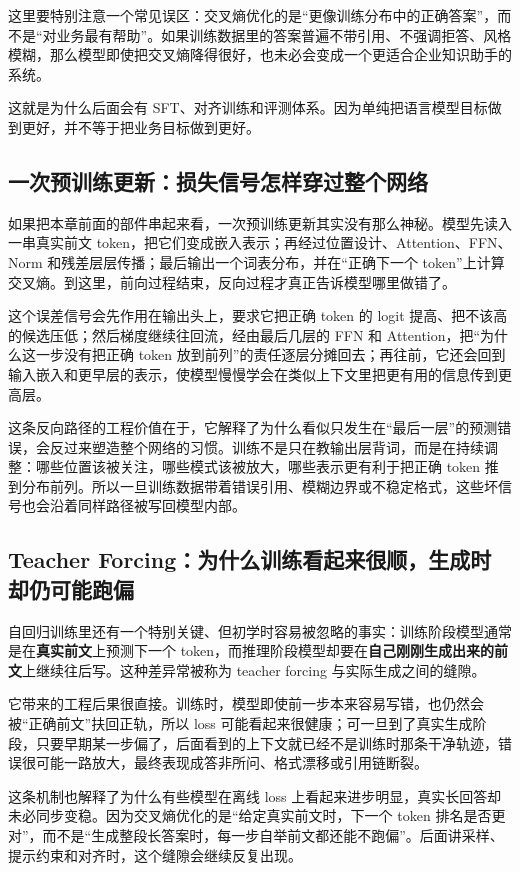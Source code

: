这里要特别注意一个常见误区：交叉熵优化的是“更像训练分布中的正确答案”，而不是“对业务最有帮助”。如果训练数据里的答案普遍不带引用、不强调拒答、风格模糊，那么模型即使把交叉熵降得很好，也未必会变成一个更适合企业知识助手的系统。

这就是为什么后面会有 SFT、对齐训练和评测体系。因为单纯把语言模型目标做到更好，并不等于把业务目标做到更好。

\subsection{一次预训练更新：损失信号怎样穿过整个网络}
如果把本章前面的部件串起来看，一次预训练更新其实没有那么神秘。模型先读入一串真实前文 token，把它们变成嵌入表示；再经过位置设计、Attention、FFN、Norm 和残差层层传播；最后输出一个词表分布，并在“正确下一个 token”上计算交叉熵。到这里，前向过程结束，反向过程才真正告诉模型哪里做错了。

这个误差信号会先作用在输出头上，要求它把正确 token 的 logit 提高、把不该高的候选压低；然后梯度继续往回流，经由最后几层的 FFN 和 Attention，把“为什么这一步没有把正确 token 放到前列”的责任逐层分摊回去；再往前，它还会回到输入嵌入和更早层的表示，使模型慢慢学会在类似上下文里把更有用的信息传到更高层。

这条反向路径的工程价值在于，它解释了为什么看似只发生在“最后一层”的预测错误，会反过来塑造整个网络的习惯。训练不是只在教输出层背词，而是在持续调整：哪些位置该被关注，哪些模式该被放大，哪些表示更有利于把正确 token 推到分布前列。所以一旦训练数据带着错误引用、模糊边界或不稳定格式，这些坏信号也会沿着同样路径被写回模型内部。

\subsection{Teacher Forcing：为什么训练看起来很顺，生成时却仍可能跑偏}
自回归训练里还有一个特别关键、但初学时容易被忽略的事实：训练阶段模型通常是在\textbf{真实前文}上预测下一个 token，而推理阶段模型却要在\textbf{自己刚刚生成出来的前文}上继续往后写。这种差异常被称为 teacher forcing 与实际生成之间的缝隙。

它带来的工程后果很直接。训练时，模型即使前一步本来容易写错，也仍然会被“正确前文”扶回正轨，所以 loss 可能看起来很健康；可一旦到了真实生成阶段，只要早期某一步偏了，后面看到的上下文就已经不是训练时那条干净轨迹，错误很可能一路放大，最终表现成答非所问、格式漂移或引用链断裂。

这条机制也解释了为什么有些模型在离线 loss 上看起来进步明显，真实长回答却未必同步变稳。因为交叉熵优化的是“给定真实前文时，下一个 token 排名是否更对”，而不是“生成整段长答案时，每一步自举前文都还能不跑偏”。后面讲采样、提示约束和对齐时，这个缝隙会继续反复出现。

